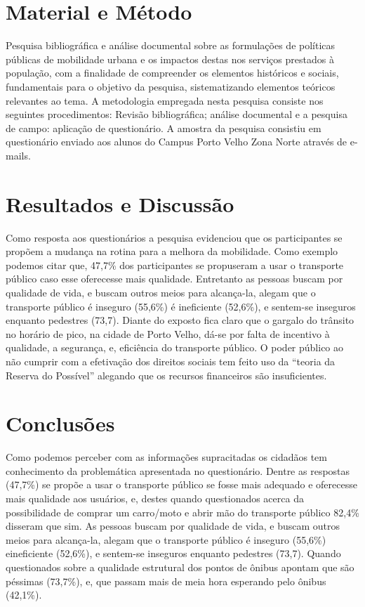 \documentclass[article,12pt,onesidea,4paper,english,brazil]{abntex2}
\begin{document}
	\section*{Material e Método}
	
	Pesquisa bibliográfica e análise documental sobre as formulações de políticas públicas de mobilidade urbana e os impactos destas nos serviços prestados à população, com a finalidade de compreender os elementos históricos e sociais, fundamentais para o objetivo da pesquisa, sistematizando elementos teóricos relevantes ao tema. A metodologia empregada nesta pesquisa consiste nos seguintes procedimentos: Revisão bibliográfica; análise documental e a pesquisa de campo: aplicação de questionário. A amostra da pesquisa consistiu em questionário enviado aos alunos do Campus Porto Velho Zona Norte através de e-mails.
	
	\section*{Resultados e Discussão}
	
	Como resposta aos questionários a pesquisa evidenciou que os participantes se propõem a mudança na rotina para a melhora da mobilidade. Como exemplo podemos citar que, 47,7\% dos participantes se propuseram a usar o transporte público caso esse oferecesse mais qualidade. Entretanto as pessoas buscam por qualidade de vida, e buscam outros meios para alcança-la, alegam que o transporte público é inseguro (55,6\%) é ineficiente (52,6\%), e sentem-se inseguros enquanto pedestres (73,7). Diante do exposto fica claro que o gargalo do trânsito no horário de pico, na cidade de Porto Velho, dá-se por falta de incentivo à qualidade, a segurança, e, eficiência do transporte público. O poder público ao não cumprir com a efetivação dos direitos sociais tem feito uso da “teoria da Reserva do Possível” alegando que os recursos financeiros são insuficientes.
	
	\section*{Conclusões}
	
	Como podemos perceber com as informações supracitadas os cidadãos tem conhecimento da problemática apresentada no questionário. Dentre as respostas (47,7\%) se propõe a usar o transporte público se fosse mais adequado e oferecesse mais qualidade aos usuários, e, destes quando questionados acerca da possibilidade de comprar um carro/moto e abrir mão do transporte público 82,4\% disseram que sim. As pessoas buscam por qualidade de vida, e buscam outros meios para alcança-la, alegam que o transporte público é inseguro (55,6\%) eineficiente (52,6\%), e sentem-se inseguros enquanto pedestres (73,7). Quando questionados sobre a qualidade estrutural dos pontos de ônibus apontam que são péssimas (73,7\%), e, que passam mais de meia hora esperando pelo ônibus (42,1\%).
	
\end{document}
